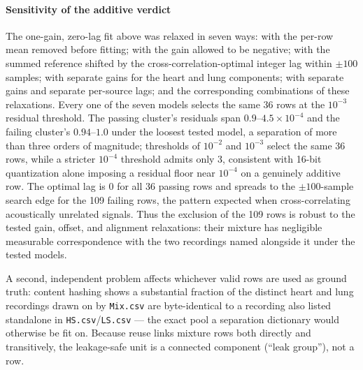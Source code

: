 \documentclass[journal]{IEEEtran}
\begin{document}
\paragraph{Sensitivity of the additive verdict}
The one-gain, zero-lag fit above was relaxed in seven ways: with the per-row mean removed before fitting; with the gain allowed to be negative; with the summed reference shifted by the cross-correlation-optimal integer lag within $\pm100$ samples; with separate gains for the heart and lung components; with separate gains and separate per-source lags; and the corresponding combinations of these relaxations. Every one of the seven models selects the same 36 rows at the $10^{-3}$ residual threshold. The passing cluster's residuals span $0.9$--$4.5\times10^{-4}$ and the failing cluster's $0.94$--$1.0$ under the loosest tested model, a separation of more than three orders of magnitude; thresholds of $10^{-2}$ and $10^{-3}$ select the same 36 rows, while a stricter $10^{-4}$ threshold admits only 3, consistent with 16-bit quantization alone imposing a residual floor near $10^{-4}$ on a genuinely additive row. The optimal lag is 0 for all 36 passing rows and spreads to the $\pm100$-sample search edge for the 109 failing rows, the pattern expected when cross-correlating acoustically unrelated signals. Thus the exclusion of the 109 rows is robust to the tested gain, offset, and alignment relaxations: their mixture has negligible measurable correspondence with the two recordings named alongside it under the tested models.

A second, independent problem affects whichever valid rows are used as ground truth: content hashing shows a substantial fraction of the distinct heart and lung recordings drawn on by \texttt{Mix.csv} are byte-identical to a recording also listed standalone in \texttt{HS.csv}/\texttt{LS.csv} --- the exact pool a separation dictionary would otherwise be fit on. Because reuse links mixture rows both directly and transitively, the leakage-safe unit is a connected component (``leak group''), not a row.
\end{document}
